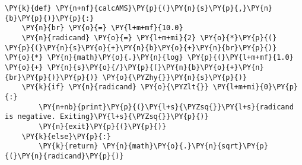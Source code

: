 {\par%
\vspace{-1\baselineskip}%
}%
\begin{notebookcell}[]%
\begin{addmargin}[\cellleftmargin]{0em}%
{\smaller%
\par%
%
\vspace{-1\smallerfontscale}%
\begin{Verbatim}[commandchars=\\\{\}]
\PY{k}{def} \PY{n+nf}{calcAMS}\PY{p}{(}\PY{n}{s}\PY{p}{,}\PY{n}{b}\PY{p}{)}\PY{p}{:}    
    \PY{n}{br} \PY{o}{=} \PY{l+m+mf}{10.0}
    \PY{n}{radicand} \PY{o}{=} \PY{l+m+mi}{2} \PY{o}{*}\PY{p}{(} \PY{p}{(}\PY{n}{s}\PY{o}{+}\PY{n}{b}\PY{o}{+}\PY{n}{br}\PY{p}{)} \PY{o}{*} \PY{n}{math}\PY{o}{.}\PY{n}{log} \PY{p}{(}\PY{l+m+mf}{1.0} \PY{o}{+} \PY{n}{s}\PY{o}{/}\PY{p}{(}\PY{n}{b}\PY{o}{+}\PY{n}{br}\PY{p}{)}\PY{p}{)} \PY{o}{\PYZhy{}}\PY{n}{s}\PY{p}{)}
    \PY{k}{if} \PY{n}{radicand} \PY{o}{\PYZlt{}} \PY{l+m+mi}{0}\PY{p}{:}
        \PY{n+nb}{print}\PY{p}{(}\PY{l+s}{\PYZsq{}}\PY{l+s}{radicand is negative. Exiting}\PY{l+s}{\PYZsq{}}\PY{p}{)}
        \PY{n}{exit}\PY{p}{(}\PY{p}{)}
    \PY{k}{else}\PY{p}{:}
        \PY{k}{return} \PY{n}{math}\PY{o}{.}\PY{n}{sqrt}\PY{p}{(}\PY{n}{radicand}\PY{p}{)}
\end{Verbatim}
%
\par%
\vspace{-1\smallerfontscale}}%
\end{addmargin}
\end{notebookcell}



